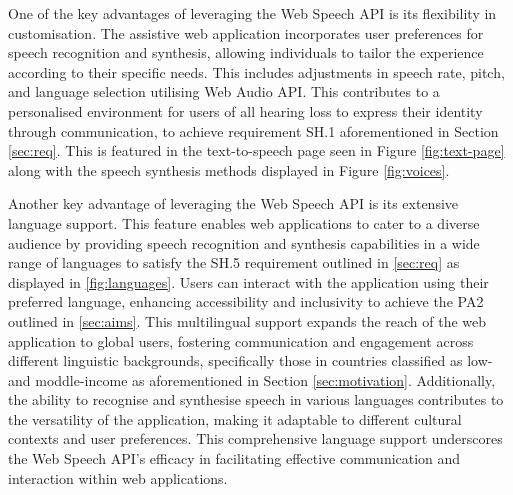 \documentclass{l4proj}
\begin{document}
One of the key advantages of leveraging the Web Speech API is its flexibility in customisation. The assistive web application incorporates user preferences for speech recognition and synthesis, allowing individuals to tailor the experience according to their specific needs. This includes adjustments in speech rate, pitch, and language selection utilising Web Audio API. This contributes to a personalised environment for users of all hearing loss to express their identity through communication, to achieve requirement SH.1 aforementioned in Section \ref{sec:req}. This is featured in the text-to-speech page seen in Figure \ref{fig:text-page} along with the speech synthesis methods displayed in Figure \ref{fig:voices}.

Another key advantage of leveraging the Web Speech API is its extensive language support. This feature enables web applications to cater to a diverse audience by providing speech recognition and synthesis capabilities in a wide range of languages to satisfy the SH.5 requirement outlined in \ref{sec:req} as displayed in \ref{fig:languages}. Users can interact with the application using their preferred language, enhancing accessibility and inclusivity to achieve the PA2 outlined in \ref{sec:aims}. This multilingual support expands the reach of the web application to global users, fostering communication and engagement across different linguistic backgrounds, specifically those in countries classified as low- and moddle-income as aforementioned in Section \ref{sec:motivation}. Additionally, the ability to recognise and synthesise speech in various languages contributes to the versatility of the application, making it adaptable to different cultural contexts and user preferences. This comprehensive language support underscores the Web Speech API's efficacy in facilitating effective communication and interaction within web applications.
\end{document}
